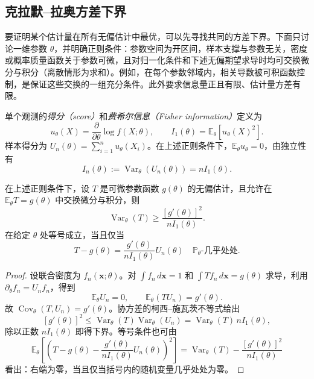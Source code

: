 \subsection{克拉默--拉奥方差下界}

要证明某个估计量在所有无偏估计中最优，可以先寻找共同的方差下界。下面只讨论一维参数 $\theta$，并明确正则条件：参数空间为开区间，样本支撑与参数无关，密度或概率质量函数关于参数可微，且对归一化条件和下述无偏期望求导时均可交换微分与积分（离散情形为求和）。例如，在每个参数邻域内，相关导数被可积函数控制，是保证这些交换的一组充分条件。此外要求信息量正且有限、估计量方差有限。

\begin{definition}[得分与费希尔信息]
\label{def:study-fisher-information}
单个观测的\emph{得分（score）}和\emph{费希尔信息（Fisher information）}定义为
\begin{equation}
  u_\theta(X)=\frac{\partial}{\partial\theta}\log f(X;\theta),
  \qquad
  I_1(\theta)=\mathbb E_\theta[u_\theta(X)^2].
  \label{eq:study-fisher-information}
\end{equation}
样本得分为 $U_n(\theta)=\sum_{i=1}^nu_\theta(X_i)$。在上述正则条件下，$\mathbb E_\theta u_\theta=0$，由独立性有
\[
  I_n(\theta):=\operatorname{Var}_\theta(U_n(\theta))
      =nI_1(\theta).
\]
\end{definition}

\begin{theorem}
\label{thm:study-cramer-rao}
在上述正则条件下，设 $T$ 是可微参数函数 $g(\theta)$ 的无偏估计，且允许在 $\mathbb E_\theta T=g(\theta)$ 中交换微分与积分，则
\begin{equation}
  \operatorname{Var}_\theta(T)
    \ge\frac{[g'(\theta)]^2}{nI_1(\theta)}.
  \label{eq:study-cramer-rao}
\end{equation}
在给定 $\theta$ 处等号成立，当且仅当
\begin{equation}
  T-g(\theta)
     =\frac{g'(\theta)}{nI_1(\theta)}U_n(\theta)
     \quad\mathbb P_\theta\text{-几乎处处}.
  \label{eq:study-cramer-rao-equality}
\end{equation}
\end{theorem}

\begin{proof}
设联合密度为 $f_n(\boldsymbol x;\theta)$。对 $\int f_n\,d\boldsymbol x=1$ 和 $\int T f_n\,d\boldsymbol x=g(\theta)$ 求导，利用 $\partial_\theta f_n=U_n f_n$，得到
\[
  \mathbb E_\theta U_n=0,\qquad
  \mathbb E_\theta(TU_n)=g'(\theta).
\]
故 $\operatorname{Cov}_\theta(T,U_n)=g'(\theta)$。协方差的柯西--施瓦茨不等式给出
\[
  [g'(\theta)]^2
    \le\operatorname{Var}_\theta(T)
       \operatorname{Var}_\theta(U_n)
    =\operatorname{Var}_\theta(T)\,nI_1(\theta),
\]
除以正数 $nI_1(\theta)$ 即得下界。等号条件也可由
\[
  \mathbb E_\theta\!\left[
    \left(T-g(\theta)-\frac{g'(\theta)}{nI_1(\theta)}U_n(\theta)\right)^2
  \right]
   =\operatorname{Var}_\theta(T)
     -\frac{[g'(\theta)]^2}{nI_1(\theta)}
\]
看出：右端为零，当且仅当括号内的随机变量几乎处处为零。
\end{proof}

